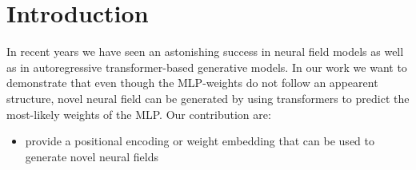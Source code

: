 \section{Introduction}
\label{sec:intro}

In recent years we have seen an astonishing success in neural field models as well as in autoregressive 
transformer-based generative models.
In our work we want to demonstrate that even though the MLP-weights do not follow an appearent
structure, novel neural field can be generated by using transformers to
predict the most-likely weights of the MLP.
Our contribution are:
\begin{itemize}
    \item provide a positional encoding or weight embedding that can be used to generate novel neural fields


\end{itemize}
